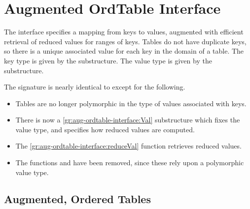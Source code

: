 \chapter{Augmented OrdTable Interface}
\label{ch:aug-ordtable-interface}

\begin{cluster}
\label{grp:grm:aug-ordtable-interface::ordtable}

\begin{gram}
\label{grm:aug-ordtable-interface::ordtable}
\label{ch:aug-ordtable-interface}
\begin{preamble}
The  interface specifies a mapping from keys to values,
augmented with
efficient retrieval of reduced values for ranges of keys. Tables do not have
duplicate
keys, so there is a unique associated value for each key in the domain of
a table. The key type is given by the  substructure. The value type
is given by the  substructure.
\end{preamble}

\end{gram}
\end{cluster}

\begin{cluster}
\label{grp:nt:aug-ordtable-interface::ordtable}

\begin{note}
\label{nt:aug-ordtable-interface::ordtable}
The  signature is nearly identical to  except
for the following.
\begin{itemize}
  \item Tables are no longer polymorphic in the type of values associated with
  keys.
  \item There is now a \ref{gr:aug-ordtable-interface:Val} substructure which
  fixes the value type, and specifies how reduced values are computed.
  \item The \ref{gr:aug-ordtable-interface:reduceVal} function retrieves
  reduced values.
  \item The functions  and  have been
  removed, since these rely upon a polymorphic value type.
\end{itemize}

\end{note}
\end{cluster}


\section{Augmented, Ordered Tables}
\label{sec:aug-ordtable-interface::augmented-ordered-tables}


